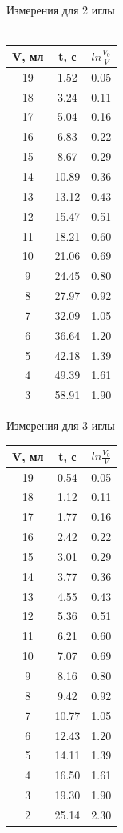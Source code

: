 \begin{minipage}{0.3\textwidth}
\begin{center}
Измерения для 2 иглы\\
\
\\
\begin{tabular}{|c|c|c|}
\hline
V, мл&\Delta t, с& $ln\frac{V_0}{V}$\\
\hline
19 & 1.52 & 0.05 \\
\hline
18 & 3.24 & 0.11 \\
\hline
17 & 5.04 & 0.16 \\
\hline
16 & 6.83 & 0.22 \\
\hline
15 & 8.67 & 0.29 \\
\hline
14 & 10.89 & 0.36 \\
\hline
13 & 13.12 & 0.43 \\
\hline
12 & 15.47 & 0.51 \\
\hline
11 & 18.21 & 0.60 \\
\hline
10 & 21.06 & 0.69 \\
\hline
9 & 24.45 & 0.80 \\
\hline
8 & 27.97 & 0.92 \\
\hline
7 & 32.09 & 1.05 \\
\hline
6 & 36.64 & 1.20 \\
\hline
5 & 42.18 & 1.39 \\
\hline
4 & 49.39 & 1.61 \\
\hline
3 & 58.91 & 1.90 \\
\hline
\end{tabular}
\end{center}
\end{minipage}
\begin{minipage}{0.3\textwidth}
\begin{center}
Измерения для 3 иглы
\begin{tabular}{|c|c|c|}
\hline
V, мл&\Delta t, с&$ ln\frac{V_0}{V}$\\
\hline
19 & 0.54 & 0.05 \\
\hline
18 & 1.12 & 0.11 \\
\hline
17 & 1.77 & 0.16 \\
\hline
16 & 2.42 & 0.22 \\
\hline
15 & 3.01 & 0.29 \\
\hline
14 & 3.77 & 0.36 \\
\hline
13 & 4.55 & 0.43 \\
\hline
12 & 5.36 & 0.51 \\
\hline
11 & 6.21 & 0.60 \\
\hline
10 & 7.07 & 0.69 \\
\hline
9 & 8.16 & 0.80 \\
\hline
8 & 9.42 & 0.92 \\
\hline
7 & 10.77 & 1.05 \\
\hline
6 & 12.43 & 1.20 \\
\hline
5 & 14.11 & 1.39 \\
\hline
4 & 16.50 & 1.61 \\
\hline
3 & 19.30 & 1.90 \\
\hline
2 & 25.14 & 2.30 \\
\hline
\end{tabular}
\end{center}
\end{minipage}
